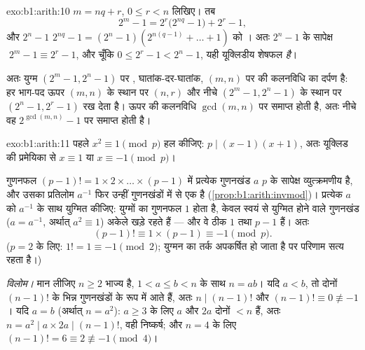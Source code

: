 \begin{solution}{exo:b1:arith:10}
$m = nq + r$, $0 \leq r < n$ लिखिए। तब
\[
2^m - 1 = 2^r\bigl(2^{nq} - 1\bigr) + 2^r - 1,
\]
और $2^n - 1$ $2^{nq} - 1 = (2^n - 1)(2^{n(q-1)} + \dots + 1)$ को । अतः $2^n - 1$ के सापेक्ष $\;2^m - 1 \equiv 2^r - 1$, और चूँकि $0
\leq 2^r - 1 < 2^n - 1$, यही यूक्लिडीय शेषफल \emph{है}।

अतः युग्म $(2^m - 1, 2^n - 1)$ पर , घातांक-दर-घातांक, $(m,
n)$ पर की कलनविधि का दर्पण है: हर भाग-पद ऊपर $(m, n)$ के स्थान पर $(n, r)$
और नीचे $(2^m - 1, 2^n - 1)$ के स्थान पर $(2^n - 1, 2^r - 1)$ रख देता है।
ऊपर की कलनविधि $\gcd(m,n)$ पर समाप्त होती है, अतः नीचे वह $2^{\gcd(m,n)} -
1$ पर समाप्त होती है।
\end{solution}

\begin{solution}{exo:b1:arith:11}
पहले $x^2 \equiv 1 \pmod p$ हल कीजिए: $p \mid (x-1)(x+1)$, अतः यूक्लिड की
प्रमेयिका से $x \equiv 1$ या $x \equiv -1 \pmod p$।

गुणनफल $(p-1)! = 1 \times 2 \times \dots \times (p-1)$ में प्रत्येक गुणनखंड
$a$ $p$ के सापेक्ष व्युत्क्रमणीय है, और उसका प्रतिलोम $a^{-1}$ फिर उन्हीं
गुणनखंडों में से एक है (\cref{prop:b1:arith:invmod})। प्रत्येक $a$ को
$a^{-1}$ के साथ युग्मित कीजिए: युग्मों का गुणनफल $1$ होता है, केवल स्वयं से
युग्मित होने वाले गुणनखंड ($a = a^{-1}$, अर्थात् $a^2 \equiv 1$) अकेले खड़े
रहते हैं --- और वे ठीक $1$ तथा $p - 1$ हैं। अतः
\[
(p-1)! \equiv 1 \times (p - 1) \equiv -1 \pmod p .
\]
($p = 2$ के लिए: $1! = 1 \equiv -1 \pmod 2$; युग्मन का तर्क अपकर्षित हो जाता
है पर परिणाम सत्य रहता है।)

\emph{विलोम।} मान लीजिए $n \geq 2$ भाज्य है, $1 < a \leq b < n$ के साथ $n =
ab$। यदि $a < b$, तो दोनों $(n-1)!$ के भिन्न गुणनखंडों के रूप में आते हैं,
अतः $n \mid (n-1)!$ और $(n-1)! \equiv 0 \not\equiv -1$। यदि $a = b$ (अर्थात्
$n = a^2$): $a \geq 3$ के लिए $a$ और $2a$ दोनों $< n$ हैं, अतः $n = a^2 \mid
a \times 2a \mid (n-1)!$, वही निष्कर्ष; और $n = 4$ के लिए $(n-1)! = 6 \equiv
2 \not\equiv -1 \pmod 4$।
\end{solution}


